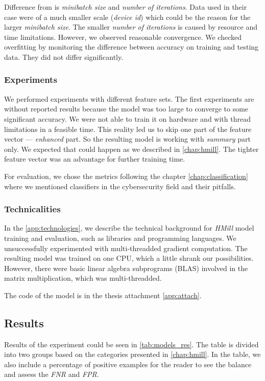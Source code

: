 Difference from \cite{Mandlik2020} is \emph{minibatch size} and \emph{number of iterations}. Data used in their case were of a much smaller scale (\emph{device id}) which could be the reason for the larger \emph{minibatch size}. The smaller \emph{number of iterations} is caused by resource and time limitations. However, we observed reasonable convergence. We checked overfitting by monitoring the difference between accuracy on training and testing data. They did not differ significantly.

\subsubsection{Experiments}
We performed experiments with different feature sets. The first experiments are without reported results because the model was too large to converge to some significant accuracy. We were not able to train it on hardware and with thread limitations in a feasible time. This reality led us to skip one part of the feature vector --- \emph{enhanced} part. So the resulting model is working with \emph{summary} part only.  We expected that could happen as we described in \ref{chap:hmill}. The tighter feature vector was an advantage for further training time.

For evaluation, we chose the metrics following the chapter \ref{chap:classification} where we mentioned classifiers in the cybersecurity field and their pitfalls.

\subsubsection{Technicalities}
In the \ref{app:technologies}, we describe the technical background for \emph{HMill} model training and evaluation, such as libraries and programming languages. We unsuccessfully experimented with multi-threadded gradient computation. The resulting model was trained on one CPU, which a little shrank our possibilities. However, there were basic linear algebra subprograms (BLAS) involved in the matrix multiplication, which was multi-threadded.

The code of the model is in the thesis attachment \ref{app:attach}.

\subsection{Results}
Results of the experiment could be seen in \ref{tab:models_res}. The table is divided into two groups based on the categories presented in \ref{chap:hmill}. In the table, we also include a percentage of positive examples for the reader to see the balance and assess the \emph{FNR} and \emph{FPR}.

